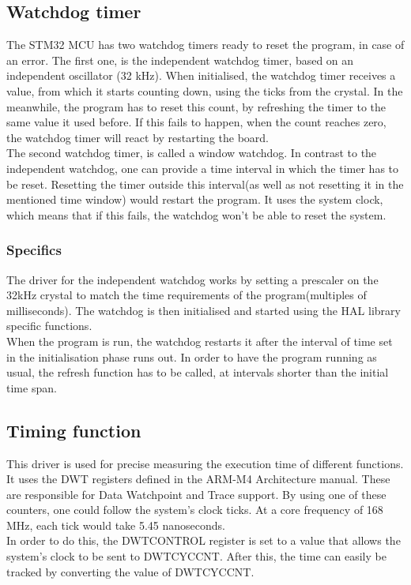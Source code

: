 \subsection{Watchdog timer}
The STM32 MCU has two watchdog timers ready to reset the program, in case of an error.
The first one, is the independent watchdog timer, based on an independent oscillator (32 kHz).
When initialised, the watchdog timer receives a value, from which it starts counting down, using
the ticks from the crystal. In the meanwhile, the program has to reset this count, by refreshing 
the timer to the same value it used before. If this fails to happen, when the count reaches zero, 
the watchdog timer will react by restarting the board.
\\
The second watchdog timer, is called a window watchdog. In contrast to the independent watchdog, 
one can provide a time interval in which the timer has to be reset. Resetting the timer outside this interval(as well as not resetting it in the mentioned time window) would restart the program. It uses 
the system clock, which means that if this fails, the watchdog won't be able to reset the system.

\subsubsection{Specifics}
The driver for the independent watchdog works by setting a prescaler on the 32kHz crystal to match 
the time requirements of the program(multiples of milliseconds). The watchdog is then initialised 
and started using the HAL library specific functions. \\
When the program is run, the watchdog restarts it after the interval of time set in the initialisation
phase runs out. In order to have the program running as usual, the refresh function has to be called,
 at intervals shorter than the initial time span.

\subsection{Timing function}
This driver is used for precise measuring the execution time of different functions. It uses the DWT
 registers defined in the ARM-M4 Architecture manual. These are responsible for Data Watchpoint 
 and Trace support. By using one of these counters, one could follow the system's clock ticks. 
 At a core frequency of 168 MHz, each tick would take 5.45 nanoseconds.\\
In order to do this, the DWT\textunderscore CONTROL register is set to a value that allows the system's clock to be sent to DWT\textunderscore CYCCNT. After this, the time can easily be tracked by converting the value of DWT\textunderscore CYCCNT.

